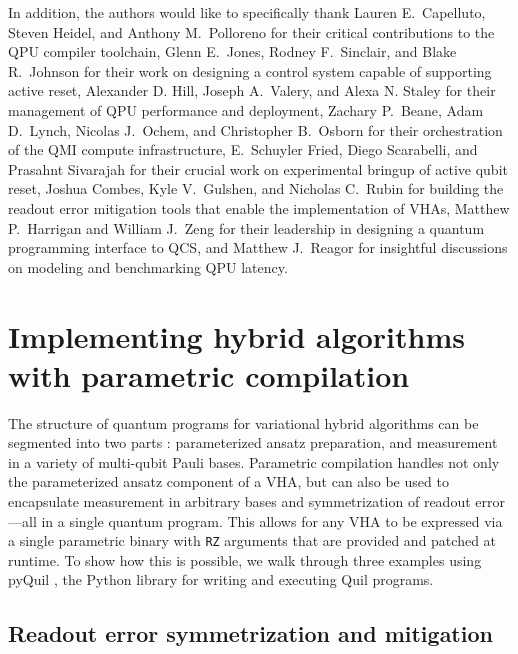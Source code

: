 \documentclass[12pt]{iopart}
\begin{document}
In addition, the authors would like to specifically thank Lauren E.\ Capelluto, Steven Heidel, and Anthony M.\ Polloreno for their critical contributions to the QPU compiler toolchain, Glenn E.\ Jones, Rodney F.\ Sinclair, and Blake R.\ Johnson for their work on designing a control system capable of supporting active reset, Alexander D. Hill, Joseph A.\ Valery, and Alexa N. Staley for their management of QPU performance and deployment, Zachary P.\ Beane, Adam D.\ Lynch, Nicolas J.\ Ochem, and Christopher B.\ Osborn for their orchestration of the QMI compute infrastructure, E.\ Schuyler Fried, Diego Scarabelli, and Prasahnt Sivarajah for their crucial work on experimental bringup of active qubit reset, Joshua Combes, Kyle V.\ Gulshen, and Nicholas C.\ Rubin for building the readout error mitigation tools that enable the implementation of VHAs, Matthew P.\ Harrigan and William J.\ Zeng for their leadership in designing a quantum programming interface to QCS, and Matthew J.\ Reagor for insightful discussions on modeling and benchmarking QPU latency.

\appendix

\section{Implementing hybrid algorithms with parametric compilation}
\label{appA}

The structure of quantum programs for variational hybrid algorithms can be segmented into two parts \cite{McCaskeyBenchmarkVQE}: parameterized ansatz preparation, and measurement in a variety of multi-qubit Pauli bases. Parametric compilation handles not only the parameterized ansatz component of a VHA, but can also be used to encapsulate measurement in arbitrary bases and symmetrization of readout error---all in a single quantum program. This allows for any VHA to be expressed via a single parametric binary with \texttt{RZ} arguments that are provided and patched at runtime. To show how this is possible, we walk through three examples using pyQuil \cite{PyQuilZenodo}, the Python library for writing and executing Quil programs.

\subsection{Readout error symmetrization and mitigation}
\end{document}
